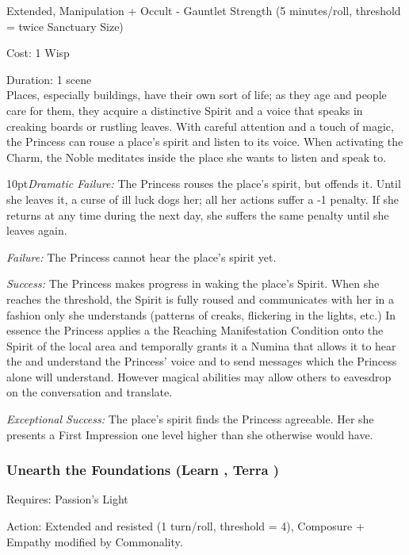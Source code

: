 \noindent Extended, Manipulation + Occult - Gauntlet Strength (5 minutes/roll, threshold = twice Sanctuary Size)

\noindent Cost: 1 Wisp

\noindent Duration: 1 scene \\

\noindent Places, especially buildings, have their own sort of life; as they age and people care for them, they acquire a distinctive Spirit and a voice that speaks in creaking boards or rustling leaves. With careful attention and a touch of magic, the Princess can rouse a place’s spirit and listen to its voice. When activating the Charm, the Noble meditates inside the place she wants to listen and speak to. 

\begin{myindentpar}{10pt}\emph{Dramatic Failure:} The Princess rouses the place’s spirit, but offends it. Until she leaves it, a curse of ill luck dogs her; all her actions suffer a -1 penalty. If she returns at any time during the next day, she suffers the same penalty until she leaves again. 

\emph{Failure:} The Princess cannot hear the place’s spirit yet. 

\emph{Success:} The Princess makes progress in waking the place’s Spirit. When she reaches the threshold, the Spirit is fully roused and communicates with her in a fashion only she
understands (patterns of creaks, flickering in the lights, etc.) In essence the Princess applies a the Reaching Manifestation Condition onto the Spirit of the local area and temporally grants it a Numina that allows it to hear the and understand the Princess' voice and to send messages which the Princess alone will understand. However magical abilities may allow others to eavesdrop on the conversation and translate. 

\emph{Exceptional Success:} The place’s spirit finds the Princess agreeable. Her she presents a First Impression one level higher than she otherwise would have. \end{myindentpar}

\subsubsection*{Unearth the Foundations (Learn \textbullet\textbullet\textbullet, Terra \textbullet)}

\noindent Requires: Passion's Light

\noindent Action: Extended and resisted (1 turn/roll, threshold = 4), Composure + Empathy modified by Commonality.

